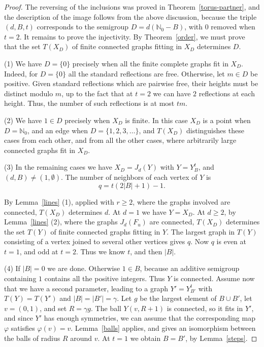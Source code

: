 \documentclass[11pt,a4paper]{article}
\begin{document}
\begin{proof}
The reversing of the inclusions was proved in Theorem~\ref{torus-partner}, and the description of the image follows from the above discussion, because the triple $(d,B,t)$ corresponds to the semigroup $D=d(\mathbb N_0-B)$, with $0$ removed when $t=2$. It remains to prove the injectivity. By Theorem~\ref{order}, we must prove that the set $T(X_D)$ of finite connected graphs fitting in $X_D$ determines $D$.

(1) We have $D=\{0\}$ precisely when all the finite complete graphs fit in $X_D$. Indeed, for $D=\{0\}$ all the standard reflections are free. Otherwise, let $m\in D$ be positive. Given standard reflections which are pairwise free, their heights must be distinct modulo $m$, up to the fact that at $t=2$ we can have $2$ reflections at each height. Thus, the number of such reflections is at most $tm$.

(2) We have $1\in D$ precisely when $X_D$ is finite. In this case $X_D$ is a point when $D=\mathbb N_0$, and an edge when $D=\{1,2,3,\ldots\}$, and $T(X_D)$ distinguishes these cases from each other, and from all the other cases, where arbitrarily large connected graphs fit in $X_D$.

(3) In the remaining cases we have $X_D=J_d(Y)$ with $Y=Y_B^t$, and $(d,B)\neq(1,\emptyset)$. The number of neighbors of each vertex of $Y$ is
\[
 q=t(2|B|+1)-1.
\]

By Lemma~\ref{lines} (1), applied with $r\geq2$, where the graphs involved are connected, $T(X_D)$ determines $d$. At $d=1$ we have $Y=X_D$. At $d\geq2$, by Lemma~\ref{lines} (2), where the graphs $J_d(F_u)$ are connected, $T(X_D)$ determines the set $T(Y)$ of finite connected graphs fitting in $Y$. The largest graph in $T(Y)$ consisting of a vertex joined to several other vertices gives $q$. Now $q$ is even at $t=1$, and odd at $t=2$. Thus we know $t$, and then $|B|$.

(4) If $|B|=0$ we are done. Otherwise $1\in B$, because an additive semigroup containing $1$ contains all the positive integers. Thus $Y$ is connected. Assume now that we have a second parameter, leading to a graph $Y'=Y_{B'}^t$ with $T(Y)=T(Y')$ and $|B|=|B'|=\gamma$. Let $g$ be the largest element of $B\cup B'$, let $v=(0,1)$, and set $R=\gamma g$. The ball $Y(v,R+1)$ is connected, so it fits in $Y'$, and since $Y'$ has enough symmetries, we can assume that the corresponding map $\varphi$ satisfies $\varphi(v)=v$. Lemma~\ref{balls} applies, and gives an isomorphism between the balls of radius $R$ around $v$. At $t=1$ we obtain $B=B'$, by Lemma~\ref{steps}.


\end{proof}
\end{document}
